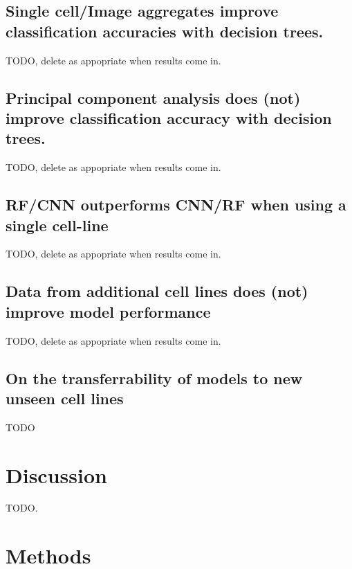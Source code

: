\documentclass[a4paper,11pt,twoside,openright]{scrbook}
\begin{document}
\subsection{Single cell/Image aggregates improve classification accuracies with decision trees.}
TODO, delete as appopriate when results come in.

\subsection{Principal component analysis does (not) improve classification accuracy with decision trees.}
TODO, delete as appopriate when results come in.

\subsection{RF/CNN outperforms CNN/RF when using a single cell-line}
TODO, delete as appopriate when results come in.


\subsection{Data from additional cell lines does (not) improve model performance}
TODO, delete as appopriate when results come in.

\subsection{On the transferrability of models to new unseen cell lines}
TODO




\section{Discussion}
TODO.










\section{Methods}
\end{document}
